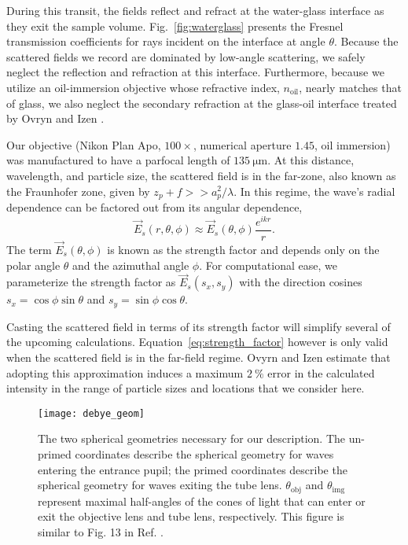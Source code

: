 During this transit, the fields reflect and refract at the water-glass interface as they
exit the sample volume. Fig.~\ref{fig:waterglass} presents the Fresnel transmission
coefficients for rays incident on the interface at angle $\theta$.
Because the scattered fields we record are dominated by low-angle scattering,
we safely neglect the reflection and refraction at this interface. Furthermore,
because we utilize an
oil-immersion objective whose refractive index, $n_{\text{oil}}$,
nearly matches that of glass, we also neglect the secondary refraction at the
glass-oil interface treated by Ovryn and Izen \cite{izen00}.

Our objective  (Nikon Plan Apo, $\num{100}\times$, numerical aperture $\num{1.45}$,
oil immersion) was manufactured to have a parfocal length of $\SI{135}{\um}$.
At this distance, wavelength, and particle size, the scattered field is in the far-zone,
also known as the Fraunhofer zone, given by $z_p + f >> a_p^2/\lambda$. In this
regime, the wave's radial dependence can be factored out from its angular dependence,
\begin{equation}
  \label{eq:strength_factor}
  \vec{E}_s(r, \theta, \phi) \approx  \vec{E}_s(\theta, \phi) \frac{e^{ikr}}{r}.
\end{equation}
The term $\vec{E}_s(\theta, \phi)$ is known as the strength factor and
depends only on the polar angle $\theta$ and the azimuthal angle $\phi$.
For computational ease, we parameterize the strength factor as $\vec{E}_s(s_x, s_y)$
with the direction cosines $s_x=\cos{\phi}\sin{\theta}$ and $s_y = \sin{\phi}\cos{\theta}$.

Casting the scattered field in terms of its strength factor will simplify
several of the upcoming calculations. Equation~\eqref{eq:strength_factor} however
is only valid when the scattered field is in the far-field regime.
Ovyrn and Izen\cite{izen00} estimate that adopting this approximation induces a maximum
$\SI{2}{\percent}$ error in the calculated intensity in the range of particle
sizes and locations that we consider here.

\begin{figure}
  \centering
  \texttt{[image: debye\_geom]}
  \caption{The two spherical geometries necessary for our description. The un-primed coordinates
    describe the spherical geometry for waves entering the entrance pupil; the primed coordinates
    describe the spherical geometry for waves exiting the tube lens. $\theta_{\text{obj}}$ and
    $\theta_{\text{img}}$ represent maximal half-angles of the cones of light that can enter or exit
    the objective lens and tube lens, respectively. This figure is similar to Fig. 13 in
    Ref. \cite{capoglu12}.}
  \label{fig:debye_geom}
\end{figure}

